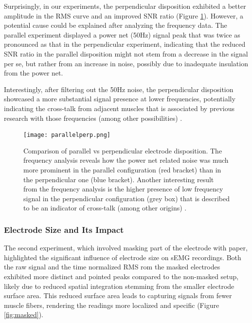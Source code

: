 \documentclass[conference]{IEEEtran}
\begin{document}
Surprisingly, in our experiments, the perpendicular disposition 
exhibited a better amplitude in the RMS 
curve and an improved SNR ratio (Figure \ref{fig:parallelperp}). 
However, a potential cause could be explained after analyzing the frequency data. 
The parallel experiment displayed a power net (50Hz) signal peak 
that was twice as pronounced as that in the perpendicular 
experiment, indicating that the reduced SNR ratio in 
the parallel disposition might not stem from a decrease in the 
signal per se, but rather from an increase in noise, possibly 
due to inadequate insulation from the power net.

Interestingly, after filtering out the 50Hz noise, the 
perpendicular disposition showcased a more substantial signal 
presence at lower frequencies, potentially indicating the 
cross-talk from adjacent muscles that is associated by previous research 
with those frequencies (among other possibilities) \cite{germerSurfaceEMGCross2021}. 

\begin{figure}[h]
   \centering
   \texttt{[image: parallelperp.png]}
   \caption{Comparison of parallel vs perpendicular electrode disposition. The frequency analysis reveals
   how the power net related noise was much more prominent in the parallel configuration (\textcolor{myred}{red bracket}) than in the perpendicular one (\textcolor{myblue}{blue bracket}).
   Another interesting result from the frequency analysis is the higher presence of low frequency signal in the perpendicular configuration (\textcolor{mygrey}{grey box}) that 
   is described to be an indicator of cross-talk (among other origins) \cite{germerSurfaceEMGCross2021}.}
   \label{fig:parallelperp}
\end{figure}

\subsubsection{Electrode Size and Its Impact}
The second experiment, which involved masking part of the electrode 
with paper, highlighted the significant influence of electrode 
size on sEMG recordings. Both the raw signal and the time normalized RMS
rom the masked electrodes exhibited more distinct and pointed peaks compared 
to the non-masked setup, likely due to reduced spatial 
integration stemming from the smaller electrode surface area. 
This reduced surface area leads to capturing signals from fewer 
muscle fibers, rendering the readings more localized and 
specific (Figure \ref{fig:masked}). 
\end{document}
